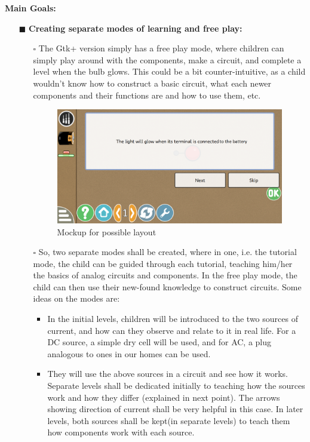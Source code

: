 \documentclass[preprint,12pt]{elsarticle}
\begin{document}
		\textbf{Main Goals:}
		\begin{itemize}
			\item[$\blacksquare$] \textbf{Creating separate modes of learning and free play:}
			\begin{itemize}
			\item[$\square$] {The Gtk+ version simply has a free play mode, where children can simply play around with the components, make a circuit, and complete a level when the bulb glows. This could be a bit counter-intuitive, as a child wouldn’t know how to construct a basic circuit, what each newer components and their functions are and how to use them, etc.}
			
			\begin{figure}[H]
			\centering\includegraphics[width=0.9\linewidth]{./images/gsoc1}
			\caption{Mockup for possible layout}
			\end{figure}
						
			\item[$\square$] {So, two separate modes shall be created, where in one, i.e. the tutorial mode, the child can be guided through each tutorial, teaching him/her the basics of analog circuits and components. In the free play mode, the child can then use their new-found knowledge to construct circuits. Some ideas on the modes are:}
			
					\begin{itemize}
					\item {In the initial levels, children will be introduced to the two sources of current, and how can they observe and relate to it in real life. For a DC source, a simple dry cell will be used, and for AC, a plug analogous to ones in our homes can be used.}
					
					\item {They will use the above sources in a circuit and see how it works. Separate levels shall be dedicated initially to teaching how the sources work and how they differ (explained in next point). The arrows showing direction of current shall be very helpful in this case. In later levels, both sources shall be kept(in separate levels) to teach them how components work with each source.}
					

\end{itemize}
\end{itemize}
\end{itemize}
\end{document}
